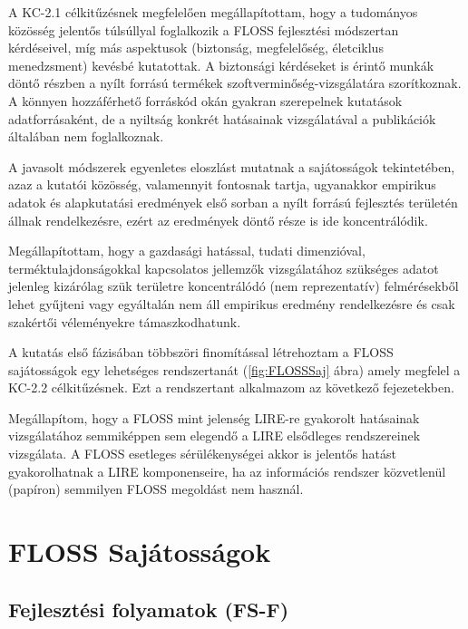 \documentclass[12pt,magyar,a4paper,oneside]{scrreprt}
\begin{document}
A KC-2.1 célkitűzésnek megfelelően megállapítottam, hogy a tudományos
közösség jelentős túlsúllyal foglalkozik a FLOSS fejlesztési módszertan
kérdéseivel, míg más aspektusok (biztonság, megfelelőség, életciklus
menedzsment) kevésbé kutatottak. A biztonsági kérdéseket is érintő
munkák döntő részben a nyílt forrású termékek
szoftverminőség-vizsgálatára szorítkoznak. A könnyen hozzáférhető
forráskód okán gyakran szerepelnek kutatások adatforrásaként, de a
nyiltság konkrét hatásainak vizsgálatával a publikációk általában nem
foglalkoznak.

A javasolt módszerek egyenletes eloszlást mutatnak a sajátosságok
tekintetében, azaz a kutatói közösség, valamennyit fontosnak tartja,
ugyanakkor empirikus adatok és alapkutatási eredmények első sorban a
nyílt forrású fejlesztés területén állnak rendelkezésre, ezért az
eredmények döntő része is ide koncentrálódik.

Megállapítottam, hogy a gazdasági hatással, tudati dimenzióval,
terméktulajdonságokkal kapcsolatos jellemzők vizsgálatához szükséges
adatot jelenleg kizárólag szük területre koncentrálódó (nem
reprezentatív) felmérésekből lehet gyűjteni vagy egyáltalán nem áll
empirikus eredmény rendelkezésre és csak szakértői véleményekre
támaszkodhatunk.

A kutatás első fázisában többszöri finomítással létrehoztam a FLOSS
sajátosságok egy lehetséges rendszertanát (\ref{fig:FLOSSSaj} ábra)
amely megfelel a KC-2.2 célkitűzésnek. Ezt a rendszertant alkalmazom az
következő fejezetekben.

Megállapítom, hogy a FLOSS mint jelenség LIRE-re gyakorolt hatásainak
vizsgálatához semmiképpen sem elegendő a LIRE elsődleges rendszereinek
vizsgálata. A FLOSS esetleges sérülékenységei akkor is jelentős hatást
gyakorolhatnak a LIRE komponenseire, ha az információs rendszer
közvetlenül (papíron) semmilyen FLOSS megoldást nem használ.

\hypertarget{sec:MASODIK}{%
\chapter{FLOSS Sajátosságok}\label{sec:MASODIK}}

\hypertarget{fejlesztuxe9si-folyamatok-fs-f}{%
\section{Fejlesztési folyamatok
(FS-F)}\label{fejlesztuxe9si-folyamatok-fs-f}}
\end{document}
